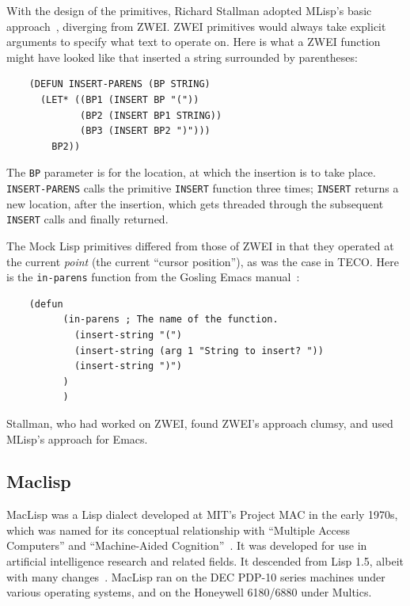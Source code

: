 \documentclass[format=acmsmall, review]{acmart}
\begin{document}
With the design of the primitives, Richard Stallman adopted MLisp's
basic approach~\cite{Stallman2018-personal}, diverging from ZWEI.
ZWEI primitives would always take explicit arguments to specify what
text to operate on.  Here is what a ZWEI function might have looked
like that inserted a string surrounded by parentheses:
%
\begin{verbatim}
    (DEFUN INSERT-PARENS (BP STRING)
      (LET* ((BP1 (INSERT BP "("))
             (BP2 (INSERT BP1 STRING))
             (BP3 (INSERT BP2 ")")))
        BP2))
\end{verbatim}
%
The \texttt{BP} parameter is for the location, at which the insertion
is to take place.  \texttt{INSERT-PARENS} calls the primitive
\texttt{INSERT} function three times; \texttt{INSERT} returns a new
location, after the insertion, which gets threaded through the
subsequent \texttt{INSERT} calls and finally returned.

The Mock Lisp primitives differed from those of ZWEI in that they operated
at the current \emph{point} (the current ``cursor position''), as was the
case in TECO.  Here is the \texttt{in-parens} function from the Gosling
Emacs manual~\cite{Gosling1981}:
%
\begin{verbatim}
    (defun
          (in-parens ; The name of the function.
            (insert-string "(")
            (insert-string (arg 1 "String to insert? "))
            (insert-string ")")
          )
          )
\end{verbatim}
%
Stallman, who had worked on ZWEI, found ZWEI's approach clumsy, and
used MLisp's approach for Emacs.

\subsection{Maclisp}

MacLisp was a Lisp dialect developed at MIT's Project MAC in the early
1970s, which was named for its conceptual relationship with ``Multiple
Access Computers'' and ``Machine-Aided Cognition''~\cite{Pitman1983}.
It was developed for use in artificial intelligence research and
related fields.  It descended from Lisp 1.5, albeit with many changes~\cite{Moon1974}.
MacLisp ran on the DEC PDP-10 series machines under various operating
systems, and on the Honeywell 6180/6880 under Multics.
\end{document}
